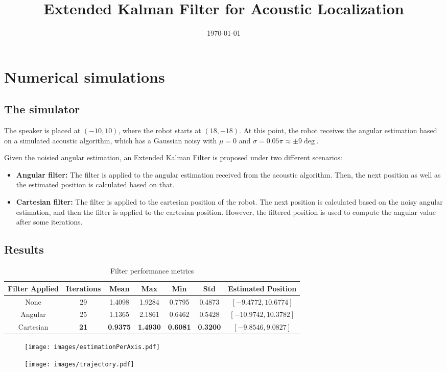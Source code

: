 \documentclass[a4paper,12pt]{article}
\begin{document}
\title{Extended Kalman Filter for Acoustic Localization}
\date{\today}
\maketitle

\section{Numerical simulations}

\subsection{The simulator}

The speaker is placed at $(-10,10)$, where the robot starts at $(18,-18)$. At this point, the robot receives the angular estimation based on a simulated acoustic algorithm, which has a Gaussian noisy with $\mu=0$ and $\sigma = 0.05 \pi \approx \pm 9 \deg$.

Given the noisied angular estimation, an Extended Kalman Filter is proposed under two different scenarios:
%
\begin{itemize}
    \item \textbf{Angular filter:} The filter is applied to the angular estimation received from the acoustic algorithm. Then, the next position as well as the estimated position is calculated based on that.
    \item \textbf{Cartesian filter:} The filter is applied to the cartesian position of the robot. The next position is calculated based on the noisy angular estimation, and then the filter is applied to the cartesian position. However, the filtered position is used to compute the angular value after some iterations. 
\end{itemize}

\subsection{Results}

\begin{table}[h!]
    \centering
    \caption{Filter performance metrics}
    \begin{tabular}{|c|c|c|c|c|c|c|}
        \hline
        \textbf{Filter Applied} & \textbf{Iterations} & \textbf{Mean} & \textbf{Max} & \textbf{Min} & \textbf{Std} & \textbf{Estimated Position} \\
        \hline
        None       & 29 & 1.4098 & 1.9284 & 0.7795 & 0.4873 & $[-9.4772, 10.6774]$ \\
        Angular    & 25 & 1.1365 & 2.1861 & 0.6462 & 0.5428 & $[-10.9742, 10.3782]$ \\
        Cartesian  & \textbf{21} & \textbf{0.9375} & \textbf{1.4930} & \textbf{0.6081} & \textbf{0.3200} & $[-9.8546, 9.0827]$ \\
        \hline
    \end{tabular}
\end{table}

\begin{figure}
    \centering
    \texttt{[image: images/estimationPerAxis.pdf]}
\end{figure}

\begin{figure}
    \centering
    \texttt{[image: images/trajectory.pdf]}
\end{figure}
\end{document}

